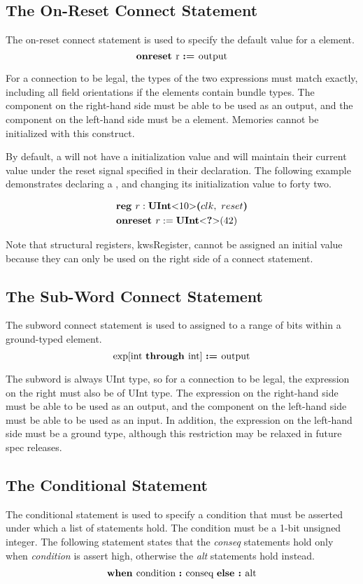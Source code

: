 \documentclass[10pt]{article}
\begin{document}
\subsection{The On-Reset Connect Statement}
The on-reset connect statement is used to specify the default value for a  element.
\[
\text{\bf onreset\ } \text{r } \text{\bf :=\ } \text{output} 
\]

For a connection to be legal, the types of the two expressions must match exactly, including all field orientations if the elements contain bundle types.
The component on the right-hand side must be able to be used as an output, and the component on the left-hand side must be a  element.
Memories cannot be initialized with this construct.

By default, a  will not have a initialization value and will maintain their current value under the reset signal specified in their declaration.
The following example demonstrates declaring a , and changing its initialization value to forty two.

\[
\begin{aligned}
& \kw{reg} r : \kws{UInt}\kws{$<$} 10 \kws{$>$} \kws{(} clk, \ reset \kws{)}\\
& \kw{onreset} r := \kws{UInt}\kws{$<$} \kws{?} \kws{$>$}(42)
\end{aligned}
\]

Note that structural registers, kws{Register}, cannot be assigned an initial value because they can only be used on the right side of a connect statement.

\subsection{The Sub-Word Connect Statement}
The subword connect statement is used to assigned to a range of bits within a ground-typed element.
\[
\text{exp}[\text{int } \text{\bf through\ } \text{int}] \ \text{\bf :=\ } \text{output} 
\]

The subword is always UInt type, so for a connection to be legal, the expression on the right must also be of UInt type.
The expression on the right-hand side must be able to be used as an output, and the component on the left-hand side must be able to be used as an input.
In addition, the expression on the left-hand side must be a ground type, although this restriction may be relaxed in future spec releases.

\subsection{The Conditional Statement}
The conditional statement is used to specify a condition that must be asserted under which a list of statements hold.
The condition must be a 1-bit unsigned integer.
The following statement states that the {\em conseq} statements hold only when {\em condition} is assert high, otherwise the {\em alt} statements hold instead.
\[
\begin{aligned}
\text{\bf when\ } \text{condition } \text{\bf :\ } \text{conseq } \text{\bf else :\ } \text{alt}
\end{aligned}
\]
\end{document}
